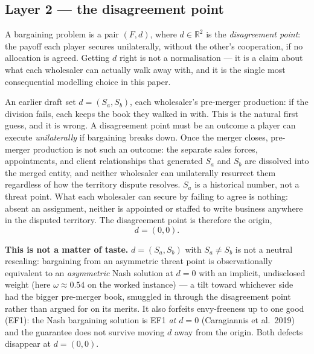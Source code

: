 \documentclass[11pt]{article}
\theoremstyle{remark}\newtheorem*{remark}{Remark}
\newcommand{\Sa}{S_a}\newcommand{\Sb}{S_b}\newcommand{\Amax}{G_a^{\max}}\newcommand{\Bmax}{G_b^{\max}}
\begin{document}
\subsection{Layer 2 --- the disagreement point}
A bargaining problem is a pair $(F,d)$, where $d\in\mathbb{R}^2$ is the
\emph{disagreement point}: the payoff each player secures unilaterally, without the
other's cooperation, if no allocation is agreed. Getting $d$ right is not a normalisation
--- it is a claim about what each wholesaler can actually walk away with, and it is the
single most consequential modelling choice in this paper.

An earlier draft set $d=(\Sa,\Sb)$, each wholesaler's pre-merger production: if the
division fails, each keeps the book they walked in with. This is the natural first guess,
and it is wrong. A disagreement point must be an outcome a player can execute
\emph{unilaterally} if bargaining breaks down. Once the merger closes, pre-merger
production is not such an outcome: the separate sales forces, appointments, and client
relationships that generated $\Sa$ and $\Sb$ are dissolved into the merged entity, and
neither wholesaler can unilaterally resurrect them regardless of how the territory
dispute resolves. $\Sa$ is a historical number, not a threat point. What each wholesaler
can secure by failing to agree is nothing: absent an assignment, neither is appointed or
staffed to write business anywhere in the disputed territory. The disagreement point is
therefore the origin,
\begin{equation}\label{eq:dpoint}
d=(0,0).
\end{equation}

\begin{warnbox}
\textbf{This is not a matter of taste.} $d=(\Sa,\Sb)$ with $\Sa\ne\Sb$ is not a neutral
rescaling: bargaining from an asymmetric threat point is observationally equivalent to
an \emph{asymmetric} Nash solution at $d=0$ with an implicit, undisclosed weight (here
$\omega\approx0.54$ on the worked instance) --- a tilt toward whichever side had the
bigger pre-merger book, smuggled in through the disagreement point rather than argued for
on its merits. It also forfeits envy-freeness up to one good (EF1): the Nash bargaining
solution is EF1 \emph{at $d=0$} (Caragiannis et al.\ 2019) and the guarantee does not
survive moving $d$ away from the origin. Both defects disappear at $d=(0,0)$.
\end{warnbox}
\end{document}
